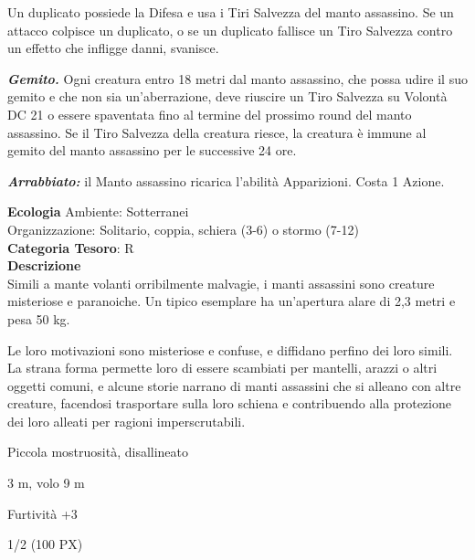 \begin{multicols}{2}
{Un duplicato possiede la Difesa e usa i Tiri Salvezza del manto assassino. Se un attacco colpisce un duplicato, o se un duplicato fallisce un Tiro Salvezza contro un effetto che infligge danni, svanisce.

\emph{\textbf{Gemito.}} Ogni creatura entro 18 metri dal manto assassino, che possa udire il suo gemito e che non sia un'aberrazione, deve riuscire un Tiro Salvezza su Volontà DC 21 o essere spaventata fino al termine del prossimo round del manto assassino. Se il Tiro Salvezza della creatura riesce, la creatura è immune al gemito del manto assassino per le successive 24 ore.

\emph{\textbf{Arrabbiato:}} il Manto assassino ricarica l'abilità Apparizioni. Costa 1 Azione.

\textbf{Ecologia}
Ambiente: Sotterranei\\
Organizzazione: Solitario, coppia, schiera (3-6) o stormo (7-12)\\
\textbf{Categoria Tesoro}: R\\
\textbf{Descrizione}\\
Simili a mante volanti orribilmente malvagie, i manti assassini sono creature misteriose e paranoiche. Un tipico esemplare ha un'apertura alare di 2,3 metri e pesa 50 kg.

Le loro motivazioni sono misteriose e confuse, e diffidano perfino dei loro simili. La strana forma permette loro di essere scambiati per mantelli, arazzi o altri oggetti comuni, e alcune storie narrano di manti assassini che si alleano con altre creature, facendosi trasportare sulla loro schiena e contribuendo alla protezione dei loro alleati per ragioni imperscrutabili.

\begin{description}[noitemsep, topsep=0pt, parsep=0pt, partopsep=0pt, itemsep=1pt, leftmargin=2.35cm,  labelwidth=2.2cm, itemindent=0cm, listparindent=0pt] %
\setlength{\baselineskip}{10pt}
\item[\textbf{Taglia/Tipo}] Piccola mostruosità, disallineato
\item[\textbf{Caratt.}] 
\item[\textbf{Punti Ferita}] 
\item[\textbf{Movimento}] 3 m, volo 9 m
\item[\textbf{Tiri Salvez.}] 
\item[\textbf{Comp.}] Furtività +3
\item[\textbf{Sensi}] 
\item[\textbf{Sfida}] 1/2 (100 PX)
\end{description}
\smallskip

}
\end{multicols}
